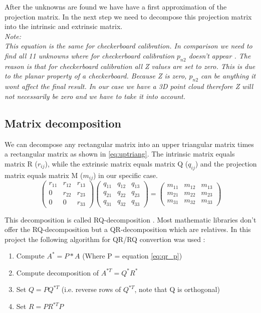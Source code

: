 \documentclass[11pt,a4paper,titlepage,oneside]{report}
\begin{document}
After the unknowns are found we have have a first approximation of the projection matrix. In the next step we need to decompose this projection matrix into the intrinsic and extrinsic matrix.\\
\em
Note:\\
This equation is the same for checkerboard calibration. In comparison we need to find all 11 unknowns where for checkerboard calibration $p_{n2}$ doesn't appear \cite{Zhang}. The reason is that for checkerboard calibration all Z values are set to zero. This is due to the planar property of a checkerboard. Because Z is zero, $p_{n2}$ can be anything it wont affect the final result. In our case we have a 3D point cloud therefore Z will not necessarily be zero and we have to take it into account.
\normalfont

\subsection{Matrix decomposition}\label{sec:matrix_dec}
We can decompose any rectangular matrix into an upper triangular matrix times a rectangular matrix as shown in \ref{eq:uptriang}. The intrinsic matrix equals matrix R ($r_{ij}$), while the extrinsic matrix equals matrix Q ($q_{ij}$) and the projection matrix equals matrix M ($m_{ij}$) in our specific case.
\begin{equation}\label{eq:uptriang}
	\begin{pmatrix}
		r_{11} & r_{12} & r_{13}\\
		0 & r_{22} & r_{23}\\
		0 & 0 & r_{33}
	\end{pmatrix}
	\begin{pmatrix}
		q_{11} & q_{12} & q_{13}\\
		q_{21} & q_{22} & q_{23}\\
		q_{31} & q_{32} & q_{33}
	\end{pmatrix}=
	\begin{pmatrix}
		m_{11} & m_{12} & m_{13}\\
		m_{21} & m_{22} & m_{23}\\
		m_{31} & m_{32} & m_{33}
	\end{pmatrix}
\end{equation}

This decomposition is called RQ-decomposition \cite{qr_decomposition}. Most mathematic libraries don't offer the RQ-decomposition but a QR-decomposition which are relatives. In this project the following algorithm for QR/RQ convertion was used \cite{rq_stack}:
\begin{enumerate}
	\item Compute $A^{*}=P*A$ (Where P = equation \ref{eq:qr_p})
	\item Compute decomposition of $A^{*T}=Q^*R^*$
	\item Set $Q=PQ^{*T}$ (i.e. reverse rows of $Q^{*T}$, note that Q is orthogonal)
	\item Set $R=PR^{*T}P$
\end{enumerate}
\end{document}

